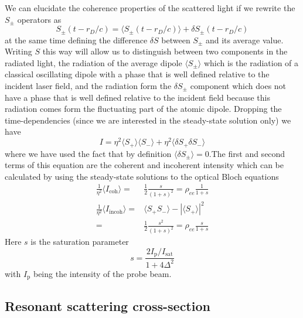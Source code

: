 \documentclass[11pt,letter]{article}
\begin{document}
We can elucidate the coherence properties of the scattered light if we rewrite the $S_{\pm}$ operators as 
\begin{equation} 
    S_{\pm}( t - r_{D}/c) = \langle S_{\pm}(t-r_{D}/c) \rangle + \delta S_{\pm}(t-r_{D}/c) 
\end{equation} 
at the same time defining the difference $\delta S$ between $S_{\pm}$ and its
average value.   Writing $S$ this way will allow us to distinguish between two
components in the radiated light,  the radiation of the average dipole $\langle
S_{\pm}\rangle$ which is the radiation of a classical oscillating dipole with
a phase that is well defined relative to the incident laser field, and the
radiation form the $\delta S_{\pm}$ component which does not have a phase that
is well defined relative to the incident field because this radiation comes
form the fluctuating part of the atomic dipole.  Dropping the time-dependencies
(since we are interested in the steady-state solution only) we have
\begin{equation} 
I  = \eta^{2} \langle S_{+}\rangle \langle S_{-} \rangle + \eta^{2} \langle \delta S_{+} \delta S_{-} \rangle 
\end{equation}
where we have used the fact that by definition $\langle \delta S_{\pm} \rangle = 0$.The first and second terms of this equation are the coherent and incoherent intensity which can be calculated by using the steady-state solutions to the optical Bloch equations
\begin{equation}
\begin{split} 
    \frac{1}{\eta^{2}} \langle I_{\mathrm{coh}} \rangle = &
        \frac{1}{2} \frac{s}{(1+s)^{2} } 
      = \rho_{ee}  \frac{1}{1+s} \\
    \frac{1}{\eta^{2}} \langle I_{\mathrm{incoh}} \rangle = & 
        \langle S_{+}S_{-} \rangle - |\langle S_{+} \rangle |^{2} \\
      =&\frac{1}{2} \frac{s^{2}}{(1+s)^{2}} = \rho_{ee} \frac{s}{1+s}
\end{split}
\end{equation}
Here $s$ is the saturation parameter
\begin{equation}
s = \frac{ 2  I_{\mathrm{p}}/I_{\mathrm{sat}} } { 1 + 4 \Delta^{2} } 
\end{equation}
with $I_{\mathrm{p}}$ being the intensity of the probe beam.  


\subsection{Resonant scattering cross-section}
\end{document}
